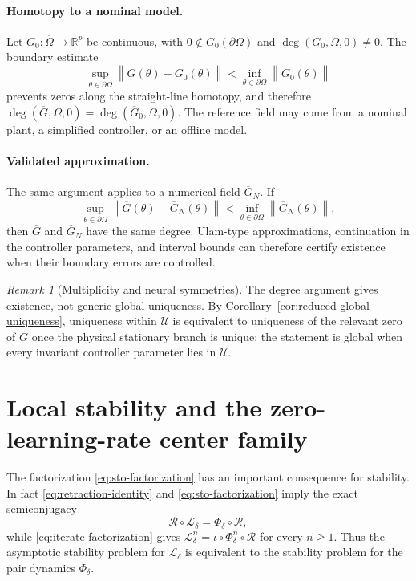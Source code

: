 \documentclass[11pt]{article}
\theoremstyle{definition}
\theoremstyle{remark}
\newtheorem{remark}[theorem]{Remark}
\newcommand{\STO}{\mathcal{L}}
\newcommand{\norm}[1]{\left\lVert #1\right\rVert}
\begin{document}
\paragraph{Homotopy to a nominal model.}
Let $G_0:\overline\Omega\to\mathbb R^p$ be continuous,
with $0\notin G_0(\partial\Omega)$ and
$\deg(G_0,\Omega,0)\ne0$. The boundary estimate
\begin{equation}
  \sup_{\theta\in\partial\Omega}
  \norm{\overline G(\theta)-\overline G_0(\theta)}
  <
  \inf_{\theta\in\partial\Omega}\norm{\overline G_0(\theta)}
  \label{eq:degree-homotopy-bound}
\end{equation}
prevents zeros along the straight-line homotopy, and therefore
\(\deg(\overline G,\Omega,0)=\deg(\overline G_0,\Omega,0)\).  The reference
field may come from a nominal plant, a simplified controller, or an offline
model.

\paragraph{Validated approximation.}
The same argument applies to a numerical field \(\overline G_N\).  If
\begin{equation}
  \sup_{\theta\in\partial\Omega}
  \norm{\overline G(\theta)-\overline G_N(\theta)}
  <
  \inf_{\theta\in\partial\Omega}\norm{\overline G_N(\theta)},
  \label{eq:degree-validated-bound}
\end{equation}
then \(\overline G\) and \(\overline G_N\) have the same degree.  Ulam-type
approximations, continuation in the controller parameters, and interval bounds
can therefore certify existence when their boundary errors are controlled.

\begin{remark}[Multiplicity and neural symmetries]
The degree argument gives existence, not generic global uniqueness.  By
Corollary~\ref{cor:reduced-global-uniqueness}, uniqueness within
\(\mathcal U\) is equivalent to uniqueness of the relevant zero of
\(\overline G\) once the physical stationary branch is unique; the statement
is global when every invariant controller parameter lies in \(\mathcal U\).  
\end{remark}


\section{Local stability and the zero-learning-rate center family}\label{5}

The factorization \eqref{eq:sto-factorization} has an important consequence for
stability.  In fact
\eqref{eq:retraction-identity} and \eqref{eq:sto-factorization} imply the exact
semiconjugacy
\begin{equation}
  \boxed{
  \mathcal R\circ\STO_\delta
  =\Phi_\delta\circ\mathcal R,}
  \label{eq:retraction-semiconjugacy}
\end{equation}
while \eqref{eq:iterate-factorization} gives
\(
\STO_\delta^n=\iota\circ\Phi_\delta^n\circ\mathcal R
\)
for every \(n\geq1\).  Thus the  asymptotic stability problem for $\STO_\delta$ is
equivalent to the stability problem for the pair dynamics \(\Phi_\delta\).
\end{document}
